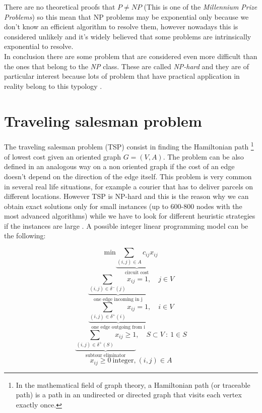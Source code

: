 There are no theoretical proofs that $P \neq NP$ (This is one of the \textit{Millennium Prize Problems}) so this mean that NP problems may be exponential only because we don't know an efficient algorithm to resolve them, however nowadays this is considered unlikely and it's widely believed that some problems are intrinsically exponential to resolve.\\
In conclusion there are some problem that are considered even more difficult than the ones that belong to the \textit{NP} class. These are called \textit{NP-hard} and they are of particular interest because lots of problem that have practical application in reality belong to this typology \cite{automi}. 

\section{Traveling salesman problem}
\label{TSPdef}
The traveling salesman problem (TSP) consist in finding the Hamiltonian path \footnote{In the mathematical field of graph theory, a Hamiltonian path (or traceable path) is a path in an undirected or directed graph that visits each vertex exactly once.} of lowest cost given an oriented graph $G=(V, A)$. The problem can be also defined in an analogous way on a non oriented graph if the cost of an edge doesn't depend  on the direction of the edge itself. This problem is very common in several real life situations, for example a courier that has to deliver parcels on different locations. However TSP is NP-hard and this is the reason why we can obtain exact solutions only for small instances (up to 600-800 nodes with the most advanced algorithms) while we have to look for different heuristic strategies if the instances are large \cite{ro}.
A possible integer linear programming model can be the following:

\begin{equation}
	\text{min} \underbrace{\sum_{(i,j) \in A} c_{ij}x_{ij}}_\text{circuit cost}
\end{equation}
\begin{equation}
	\underbrace{\sum_{(i,j) \in \delta^{-}(j)} x_{ij} = 1}_\text{one edge incoming in j}, \quad j \in V 
	\label{eqn:1.2}
\end{equation}
\begin{equation}
	\underbrace{\sum_{(i,j) \in \delta^{+}(i)} x_{ij} = 1}_\text{one edge outgoing from i}, \quad i \in V
	\label{eqn:1.3}
\end{equation}
\begin{equation}
	\underbrace{\sum_{(i,j) \in \delta^{+}(S)} x_{ij} \geq 1}_\text{subtour eliminator}, \quad S \subset V \ : \ 1 \in S
	\label{eqn:1.4}
\end{equation}
\begin{equation}
	x_{ij} \geq 0 \ \text{integer,} \ (i,j) \in A 
\end{equation}

